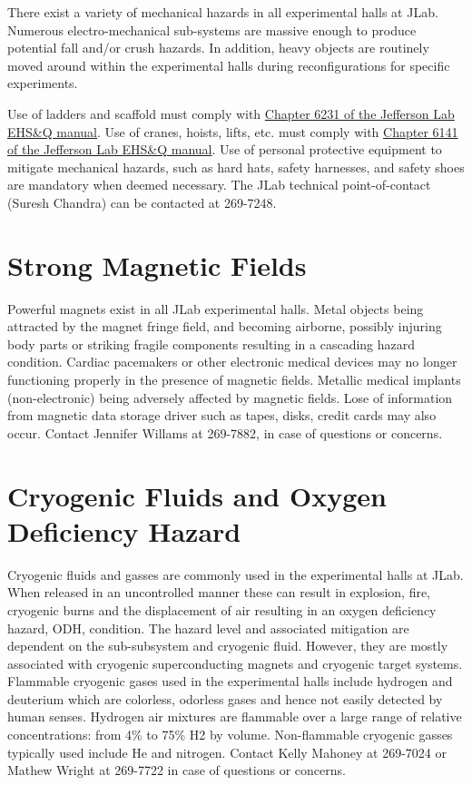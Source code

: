 	There exist a variety of mechanical hazards in all experimental halls at JLab. 
Numerous electro-mechanical sub-systems are massive enough to produce potential fall 
and/or crush hazards.  In addition, heavy objects are routinely moved around within 
the experimental halls during reconfigurations for specific experiments. 

Use of ladders and scaffold must comply 
with \href{http://www.jlab.org/ehs/ehsmanual/manual/6132.html}{Chapter 6231 of the 
Jefferson Lab EHS\&Q manual}.
Use of cranes, hoists, lifts, etc. must comply with
\href{http://www.jlab.org/ehs/ehsmanual/manual/6141.html}{Chapter 6141 of the 
Jefferson Lab EHS\&Q manual}. 
Use of personal protective equipment 
to mitigate mechanical hazards, such as hard hats, safety harnesses, and safety 
shoes are mandatory when deemed necessary.
The JLab technical point-of-contact (Suresh Chandra) can be contacted at 269-7248.

\section{Strong Magnetic Fields}

	Powerful magnets exist in all JLab experimental halls. Metal objects being attracted 
by the magnet fringe field, and becoming airborne, possibly injuring body parts or striking 
fragile components resulting in a cascading hazard condition. Cardiac pacemakers or other 
electronic medical devices may no longer functioning properly in the presence of magnetic fields. 
Metallic medical implants (non-electronic) being adversely affected by magnetic fields. Lose of 
information from magnetic data storage driver such as tapes, disks, credit cards may also occur. 
Contact Jennifer Willams at 269-7882, in case of questions or concerns.

\section{Cryogenic Fluids and Oxygen Deficiency Hazard}

	Cryogenic fluids and gasses are commonly used in the experimental halls at JLab. 
When released in an uncontrolled manner these can result in explosion, fire, cryogenic 
burns and the displacement of air resulting in an oxygen deficiency hazard, ODH, condition. The hazard level and 
associated mitigation are dependent on the sub-subsystem and cryogenic fluid. However, 
they are mostly associated with cryogenic superconducting magnets and cryogenic target systems. 
Flammable cryogenic gases used in the experimental halls include hydrogen and deuterium which 
are colorless, odorless gases and hence not easily detected by human senses. Hydrogen air 
mixtures are flammable over a large range of relative concentrations: from 4\% to 75\% H2 by volume. 
Non-flammable cryogenic gasses typically used include He and nitrogen.  Contact Kelly Mahoney at
269-7024 or Mathew Wright at 269-7722 in case of questions or concerns.

